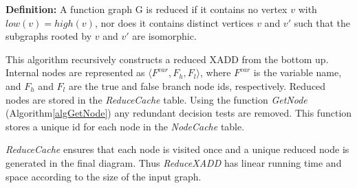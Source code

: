 \documentclass[twoside,11pt]{article}
\begin{document}
\textbf{Definition:} A function graph G is reduced if it contains no vertex $v$ with $low(v)=high(v)$, nor does it contains distinct vertices $v$ and $v′$ such that the subgraphs rooted by $v$ and $v′$ are isomorphic.

This algorithm recursively constructs a reduced XADD from the bottom up. Internal nodes are represented as $\langle F^{\mathit{var}}, F_h, F_l \rangle$, where $F^{\mathit{var}}$ is the variable name, and $F_h$ and $F_l$ are the true and false branch node ids, respectively. Reduced nodes are stored in the \emph{ReduceCache} table.
Using the function \emph{GetNode} (Algorithm\ref{algGetNode}) any redundant decision tests are removed. This function stores a unique id for each node in the \emph{NodeCache} table. 

\emph{ReduceCache} ensures that each node is visited once and a unique reduced node is generated in the final diagram. Thus \emph{ReduceXADD} has linear running time and space according to the size of the input graph. 
\end{document}
